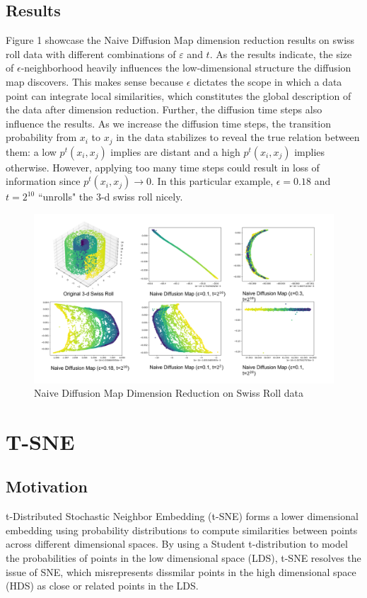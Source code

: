 \documentclass[11pt]{article}
\begin{document}
\subsection{Results}
Figure 1 showcase the Naive Diffusion Map dimension reduction results on swiss roll data with different combinations of $\varepsilon$ and $t$. As the results indicate, the size of $\epsilon$-neighborhood heavily influences the low-dimensional structure the diffusion map discovers. This makes sense because $\epsilon$ dictates the scope in which a data point can integrate local similarities, which constitutes the global description of the data after dimension reduction. Further, the diffusion time steps also influence the results. As we increase the diffusion time steps, the transition probability from $x_i$ to $x_j$ in the data stabilizes to reveal the true relation between them: a low $p^t(x_i,x_j)$ implies are distant and a high $p^t(x_i,x_j)$ implies otherwise. However, applying too many time steps could result in loss of information since $p^t(x_i,x_j)\rightarrow 0$. In this particular example, $\epsilon=0.18$ and $t=2^{10}$ “unrolls" the 3-d swiss roll nicely.
\begin{figure}[h!]
\centering
\includegraphics[scale=0.4]{naive_results.png}
\caption{Naive Diffusion Map Dimension Reduction on Swiss Roll data}
\label{fig: t_SNE before standardizing}
\end{figure}
\section{T-SNE} \label{sec: T-SNE}
\subsection{Motivation}
\hspace{5mm}t-Distributed Stochastic Neighbor Embedding (t-SNE) forms a lower dimensional embedding using probability distributions to compute similarities between points across different dimensional spaces. By using a Student t-distribution to model the probabilities of points in the low dimensional space (LDS), t-SNE resolves the issue of SNE, which misrepresents dissmilar points in the high dimensional space (HDS) as close or related points in the LDS.
\end{document}
